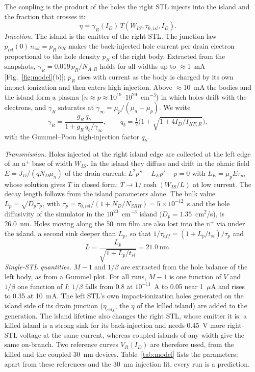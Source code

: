 \documentclass[journal]{IEEEtran}
\begin{document}
The coupling is the product of the holes the right STL injects into the island and the fraction that crosses it:
\begin{equation}
\eta=\gamma_R(I_D)\,T(W_{IS},\tau_{0,isl},I_D).
\label{eq:eta}
\end{equation}
\textit{Injection.} The island is the emitter of the right STL. The junction law $p_{isl}(0)\,n_{isl}=p_R\,n_R$ makes the back-injected hole current per drain electron proportional to the hole density $p_R$ of the right body. Extracted from the snapshots, $\gamma_R=0.019\,p_R/N_{A,R}$ holds for all widths up to $\approx$1~mA [Fig.~\ref{fig:model}(b)]; $p_R$ rises with current as the body is charged by its own impact ionization and then enters high injection. Above $\approx$10~mA the bodies and the island form a plasma ($n\approx p\approx10^{19}$--$10^{20}$~cm$^{-3}$) in which holes drift with the electrons, and $\gamma_R$ saturates at $\gamma_\infty=\mu_p/(\mu_n+\mu_p)$. We write
\begin{equation}
\gamma_R=\frac{g_R\,q_b}{1+g_R\,q_b/\gamma_\infty},\qquad q_b=\tfrac12\bigl(1+\sqrt{1+4I_D/I_{KF,R}}\bigr),
\label{eq:gamma}
\end{equation}
with the Gummel--Poon high-injection factor $q_b$.

\textit{Transmission.} Holes injected at the right island edge are collected at the left edge of an n$^+$ base of width $W_{IS}$. In the island they diffuse and drift in the ohmic field $E=J_D/(qN_D\mu_n)$ of the drain current: $L^2p''-L_Ep'-p=0$ with $L_E=\mu_pE\tau_p$, whose solution gives $T$ in closed form; $T\rightarrow1/\cosh(W_{IS}/L)$ at low current. The decay length follows from the island parameters alone. The bulk value $L_p=\sqrt{D_p\tau_p}$, with $\tau_p=\tau_{0,isl}/(1+N_D/N_{SRH})=5\times10^{-12}$~s and the hole diffusivity of the simulator in the $10^{20}$~cm$^{-3}$ island ($D_p=1.35$~cm$^2$/s), is 26.0~nm. Holes moving along the 50~nm film are also lost into the n$^+$ via under the island, a second sink deeper than $L_p$, so that $1/\tau_{eff}=(1+L_p/t_{si})/\tau_p$ and
\begin{equation}
L=\frac{L_p}{\sqrt{1+L_p/t_{si}}}=21.0~\mathrm{nm}.
\label{eq:L}
\end{equation}
\textit{Single-STL quantities.} $M-1$ and $1/\beta$ are extracted from the hole balance of the left body, as from a Gummel plot. For all runs, $M-1$ is one function of $V$ and $1/\beta$ one function of $I$; $1/\beta$ falls from 0.8 at $10^{-11}$~A to 0.05 near 1~$\mu$A and rises to 0.35 at 10~mA. The left STL's own impact-ionization holes generated on the island side of its drain junction ($\eta_{self}$, the $\eta$ of the killed island) are added to the generation. The island lifetime also changes the right STL, whose emitter it is: a killed island is a strong sink for its back-injection and needs 0.45~V more right-STL voltage at the same current, whereas coupled islands of any width give the same on-branch. Two reference curves $V_R(I_D)$ are therefore used, from the killed and the coupled 30~nm devices. Table~\ref{tab:model} lists the parameters; apart from these references and the 30~nm injection fit, every run is a prediction.
\end{document}
